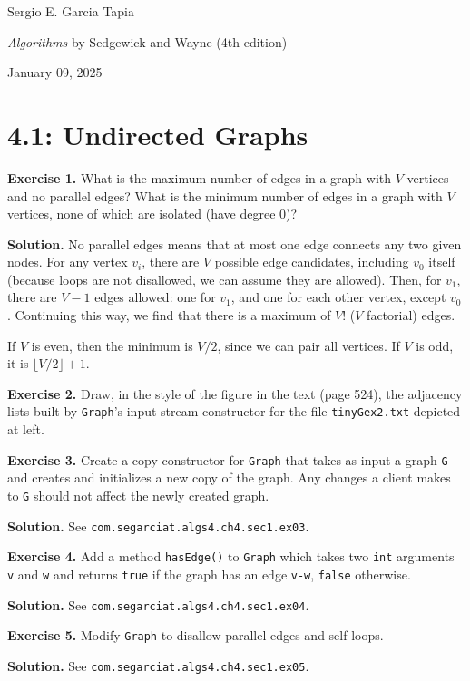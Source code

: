 \documentclass[12pt, a4paper]{article}
\newenvironment{ex}[2][Exercise]
{\par\medskip\noindent \textbf{#1 #2.}}
{\medskip}
\newenvironment{sol}[1][Solution]
{\par\medskip\noindent \textbf{#1.} }
{\medskip}
\begin{document}
	\noindent Sergio E. Garcia Tapia \hfill
	
	\noindent \emph{Algorithms} by Sedgewick and Wayne (4th edition) \cite{sedgewick_wayne}\hfill
	
	\noindent January 09, 2025\hfill 
	\section*{4.1: Undirected Graphs}
	\begin{ex}{1}
		What is the maximum number of edges in a graph with $V$ vertices and no parallel
		edges? What is the minimum number of edges in a graph with $V$ vertices, none of
		which are isolated (have degree $0$)?
	\end{ex}
	\begin{sol}
		No parallel edges means that at most one edge connects any two given nodes.
		For any vertex $v_i$, there are $V$ possible edge candidates, including $v_0$
		itself (because loops are not disallowed, we can assume they are allowed).
		Then, for $v_1$, there are $V-1$ edges allowed: one for $v_1$, and one for each
		other vertex, except $v_0$. Continuing this way, we find that there is
		a maximum of $V!$ ($V$ factorial) edges.
		
		If $V$ is even, then the minimum is $V / 2$, since we can pair all vertices.
		If $V$ is odd, it is $\lfloor V / 2\rfloor + 1$.
	\end{sol}
	\begin{ex}{2}
		Draw, in the style of the figure in the text (page 524), the adjacency lists
		built by \texttt{Graph}'s input stream constructor for the file \texttt{tinyGex2.txt}
		depicted at left.
	\end{ex}
	\begin{ex}{3}
		Create a copy constructor for \texttt{Graph} that takes as input a graph
		\texttt{G} and creates and initializes a new copy of the graph. Any changes
		a client makes to \texttt{G} should not affect the newly created graph.
	\end{ex}
	\begin{sol}
		See \texttt{com.segarciat.algs4.ch4.sec1.ex03}.
	\end{sol}
	\begin{ex}{4}
		Add a method \texttt{hasEdge()} to \texttt{Graph} which takes two \texttt{int}
		arguments \texttt{v} and \texttt{w} and returns \texttt{true} if the graph has
		an edge \texttt{v-w}, \texttt{false} otherwise.
	\end{ex}
	\begin{sol}
		See \texttt{com.segarciat.algs4.ch4.sec1.ex04}.
	\end{sol}
	\begin{ex}{5}
		Modify \texttt{Graph} to disallow parallel edges and self-loops.
	\end{ex}
	\begin{sol}
		See \texttt{com.segarciat.algs4.ch4.sec1.ex05}.
	\end{sol}
	\pagebreak
	\printbibliography
\end{document}
